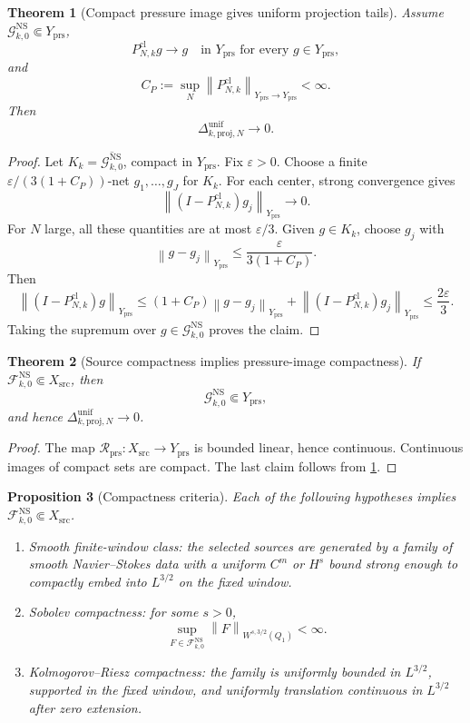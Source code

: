 \documentclass[11pt]{article}
\numberwithin{equation}{section}
\theoremstyle{plain}
\newtheorem{theorem}{Theorem}[section]
\newtheorem{proposition}[theorem]{Proposition}
\theoremstyle{definition}
\theoremstyle{remark}
\newcommand{\NS}{\mathrm{NS}}
\newcommand{\cl}{\mathrm{cl}}
\newcommand{\prs}{\mathrm{prs}}
\newcommand{\proj}{\mathrm{proj}}
\newcommand{\F}{\mathcal F}
\newcommand{\Rprs}{\mathcal R_{\prs}}
\newcommand{\norm}[1]{\left\lVert #1\right\rVert}
\begin{document}
\begin{theorem}[Compact pressure image gives uniform projection tails]\label{thm:compact-image-proj}
Assume \(\mathcal G_{k,0}^{\NS}\Subset Y_{\prs}\),
\[
  P_{N,k}^{\cl}g\to g\quad\text{in }Y_{\prs}\text{ for every }g\in Y_{\prs},
\]
and
\[
  C_P:=\sup_N\norm{P_{N,k}^{\cl}}_{Y_{\prs}\to Y_{\prs}}<\infty.
\]
Then
\[
  \Delta_{k,\proj,N}^{\mathrm{unif}}\to0.
\]
\end{theorem}

\begin{proof}
Let \(K_k=\overline{\mathcal G_{k,0}^{\NS}}\), compact in \(Y_{\prs}\).
Fix \(\varepsilon>0\).  Choose a finite
\(\varepsilon/(3(1+C_P))\)-net \(g_1,\dots,g_J\) for \(K_k\).  For each
center, strong convergence gives
\[
  \norm{(I-P_{N,k}^{\cl})g_j}_{Y_{\prs}}\to0.
\]
For \(N\) large, all these quantities are at most \(\varepsilon/3\).  Given
\(g\in K_k\), choose \(g_j\) with
\[
  \norm{g-g_j}_{Y_{\prs}}\le \frac{\varepsilon}{3(1+C_P)}.
\]
Then
\[
  \norm{(I-P_{N,k}^{\cl})g}_{Y_{\prs}}
  \le
  (1+C_P)\norm{g-g_j}_{Y_{\prs}}
  +\norm{(I-P_{N,k}^{\cl})g_j}_{Y_{\prs}}
  \le
  \frac{2\varepsilon}{3}.
\]
Taking the supremum over \(g\in\mathcal G_{k,0}^{\NS}\) proves the claim.
\end{proof}

\begin{theorem}[Source compactness implies pressure-image compactness]\label{thm:source-compact}
If \(\F_{k,0}^{\NS}\Subset X_{\mathrm{src}}\), then
\[
  \mathcal G_{k,0}^{\NS}\Subset Y_{\prs},
\]
and hence \(\Delta_{k,\proj,N}^{\mathrm{unif}}\to0\).
\end{theorem}

\begin{proof}
The map \(\Rprs:X_{\mathrm{src}}\to Y_{\prs}\) is bounded linear, hence
continuous.  Continuous images of compact sets are compact.  The last claim
follows from \cref{thm:compact-image-proj}.
\end{proof}

\begin{proposition}[Compactness criteria]\label{prop:compactness-criteria}
Each of the following hypotheses implies
\(\F_{k,0}^{\NS}\Subset X_{\mathrm{src}}\).
\begin{enumerate}[label=(\alph*)]
  \item Smooth finite-window class: the selected sources are generated by a
  family of smooth Navier--Stokes data with a uniform \(C^m\) or \(H^s\)
  bound strong enough to compactly embed into \(L^{3/2}\) on the fixed
  window.
  \item Sobolev compactness: for some \(s>0\),
  \[
    \sup_{F\in\F_{k,0}^{\NS}}\norm{F}_{W^{s,3/2}(Q_1)}<\infty.
  \]
  \item Kolmogorov--Riesz compactness: the family is uniformly bounded in
  \(L^{3/2}\), supported in the fixed window, and uniformly translation
  continuous in \(L^{3/2}\) after zero extension.
\end{enumerate}
\end{proposition}
\end{document}
